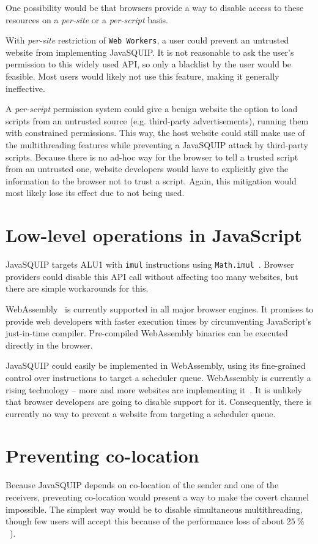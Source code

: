 \documentclass[11pt,
  titlepage=false,
  parskip=half,      %
]{scrreprt}
\begin{document}
One possibility would be that browsers provide a way to disable access to these resources on a \textit{per-site} or a \textit{per-script} basis.

With \textit{per-site} restriction of \texttt{Web Workers}, a user could prevent an untrusted website from implementing JavaSQUIP.
It is not reasonable to ask the user's permission to this widely used API,
so only a blacklist by the user would be feasible.
Most users would likely not use this feature, making it generally ineffective.

A \textit{per-script} permission system could give a benign website the option to load scripts from an untrusted source (e.g. third-party advertisements),
running them with constrained permissions.
This way, the host website could still make use of the multithreading features while preventing a JavaSQUIP attack by third-party scripts.
Because there is no ad-hoc way for the browser to tell a trusted script from an untrusted one,
website developers would have to explicitly give the information to the browser not to trust a script.
Again, this mitigation would most likely lose its effect due to not being used.

\section{Low-level operations in JavaScript}
JavaSQUIP targets ALU1 with \texttt{imul} instructions using \texttt{Math.imul}~\cite{mathimul}.
Browser providers could disable this API call without affecting too many websites,
but there are simple workarounds for this.

WebAssembly~\cite{webassembly} is currently supported in all major browser engines.
It promises to provide web developers with faster execution times by circumventing JavaScript's just-in-time compiler.
Pre-compiled WebAssembly binaries can be executed directly in the browser.

JavaSQUIP could easily be implemented in WebAssembly, using its fine-grained control over instructions to
target a scheduler queue.
WebAssembly is currently a rising technology -- more and more websites are implementing it~\cite{musch2019new}.
It is unlikely that browser developers are going to disable support for it.
Consequently, there is currently no way to prevent a website from targeting a scheduler queue.

\section{Preventing co-location}
Because JavaSQUIP depends on co-location of the sender and one of the receivers,
preventing co-location would present a way to make the covert channel impossible.
The simplest way would be to disable simultaneous multithreading,
though few users will accept this because of the performance loss of about $25~\%$~\cite{Phoronix2018HT, Cutress2020SMT}).
\end{document}
